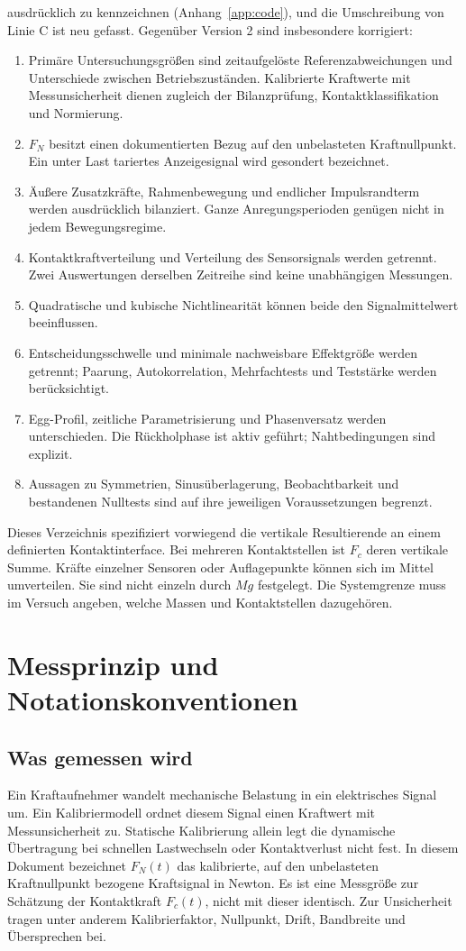 \documentclass[11pt,a4paper]{article}
\begin{document}
ausdrücklich zu kennzeichnen (Anhang~\ref{app:code}), und die Umschreibung von Linie C ist neu gefasst. Gegenüber Version 2 sind insbesondere korrigiert:
\begin{enumerate}
\item Primäre Untersuchungsgrößen sind zeitaufgelöste Referenzabweichungen und Unterschiede zwischen Betriebszuständen. Kalibrierte Kraftwerte mit Messunsicherheit dienen zugleich der Bilanzprüfung, Kontaktklassifikation und Normierung.
\item $F_N$ besitzt einen dokumentierten Bezug auf den unbelasteten Kraftnullpunkt. Ein unter Last tariertes Anzeigesignal wird gesondert bezeichnet.
\item Äußere Zusatzkräfte, Rahmenbewegung und endlicher Impulsrandterm werden ausdrücklich bilanziert. Ganze Anregungsperioden genügen nicht in jedem Bewegungsregime.
\item Kontaktkraftverteilung und Verteilung des Sensorsignals werden getrennt. Zwei Auswertungen derselben Zeitreihe sind keine unabhängigen Messungen.
\item Quadratische und kubische Nichtlinearität können beide den Signalmittelwert beeinflussen.
\item Entscheidungsschwelle und minimale nachweisbare Effektgröße werden getrennt; Paarung, Autokorrelation, Mehrfachtests und Teststärke werden berücksichtigt.
\item Egg-Profil, zeitliche Parametrisierung und Phasenversatz werden unterschieden. Die Rückholphase ist aktiv geführt; Nahtbedingungen sind explizit.
\item Aussagen zu Symmetrien, Sinusüberlagerung, Beobachtbarkeit und bestandenen Nulltests sind auf ihre jeweiligen Voraussetzungen begrenzt.
\end{enumerate}
Dieses Verzeichnis spezifiziert vorwiegend die vertikale Resultierende an einem definierten Kontaktinterface. Bei mehreren Kontaktstellen ist $F_c$ deren vertikale Summe. Kräfte einzelner Sensoren oder Auflagepunkte können sich im Mittel umverteilen. Sie sind nicht einzeln durch $Mg$ festgelegt. Die Systemgrenze muss im Versuch angeben, welche Massen und Kontaktstellen dazugehören.

\section{Messprinzip und Notationskonventionen}\label{sec:messprinzip}
\subsection{Was gemessen wird}
Ein Kraftaufnehmer wandelt mechanische Belastung in ein elektrisches Signal um. Ein Kalibriermodell ordnet diesem Signal einen Kraftwert mit Messunsicherheit zu. Statische Kalibrierung allein legt die dynamische Übertragung bei schnellen Lastwechseln oder Kontaktverlust nicht fest.
In diesem Dokument bezeichnet $F_N(t)$ das kalibrierte, auf den unbelasteten Kraftnullpunkt bezogene Kraftsignal in Newton. Es ist eine Messgröße zur Schätzung der Kontaktkraft $F_c(t)$, nicht mit dieser identisch. Zur Unsicherheit tragen unter anderem Kalibrierfaktor, Nullpunkt, Drift, Bandbreite und Übersprechen bei.
\end{document}
